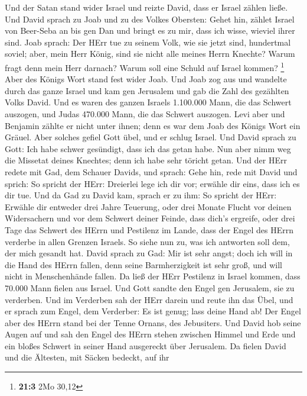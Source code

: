  Und der Satan stand wider Israel und reizte David, dass
er Israel zählen ließe.  Und David sprach zu Joab und zu
des Volkes Obersten: Gehet hin, zählet Israel von Beer-Seba an bis gen
Dan und bringt es zu mir, dass ich wisse, wieviel ihrer sind.
 Joab sprach: Der HErr tue zu seinem Volk, wie sie jetzt
sind, hundertmal soviel; aber, mein Herr König, sind sie nicht alle
meines Herrn Knechte? Warum fragt denn mein Herr darnach? Warum soll
eine Schuld auf Israel kommen? \footnote{\textbf{21:3} 2Mo 30,12}
 Aber des Königs Wort stand fest wider Joab. Und Joab zog
aus und wandelte durch das ganze Israel und kam gen Jerusalem
 und gab die Zahl des gezählten Volks David. Und es waren
des ganzen Israels 1.100.000 Mann, die das Schwert auszogen, und Judas
470.000 Mann, die das Schwert auszogen.  Levi aber und
Benjamin zählte er nicht unter ihnen; denn es war dem Joab des Königs
Wort ein Gräuel.  Aber solches gefiel Gott übel, und er
schlug Israel.  Und David sprach zu Gott: Ich habe schwer
gesündigt, dass ich das getan habe. Nun aber nimm weg die Missetat
deines Knechtes; denn ich habe sehr töricht getan.  Und
der HErr redete mit Gad, dem Schauer Davids, und sprach: 
Gehe hin, rede mit David und sprich: So spricht der HErr: Dreierlei lege
ich dir vor; erwähle dir eins, dass ich es dir tue.  Und
da Gad zu David kam, sprach er zu ihm: So spricht der HErr: Erwähle dir
 entweder drei Jahre Teuerung, oder drei Monate Flucht
vor deinen Widersachern und vor dem Schwert deiner Feinde, dass dich's
ergreife, oder drei Tage das Schwert des HErrn und Pestilenz im Lande,
dass der Engel des HErrn verderbe in allen Grenzen Israels. So siehe nun
zu, was ich antworten soll dem, der mich gesandt hat. 
David sprach zu Gad: Mir ist sehr angst; doch ich will in die Hand des
HErrn fallen, denn seine Barmherzigkeit ist sehr groß, und will nicht in
Menschenhände fallen.  Da ließ der HErr Pestilenz in
Israel kommen, dass 70.000 Mann fielen aus Israel.  Und
Gott sandte den Engel gen Jerusalem, sie zu verderben. Und im Verderben
sah der HErr darein und reute ihn das Übel, und er sprach zum Engel, dem
Verderber: Es ist genug; lass deine Hand ab! Der Engel aber des HErrn
stand bei der Tenne Ornans, des Jebusiters.  Und David
hob seine Augen auf und sah den Engel des HErrn stehen zwischen Himmel
und Erde und ein bloßes Schwert in seiner Hand ausgereckt über
Jerusalem. Da fielen David und die Ältesten, mit Säcken bedeckt, auf ihr

